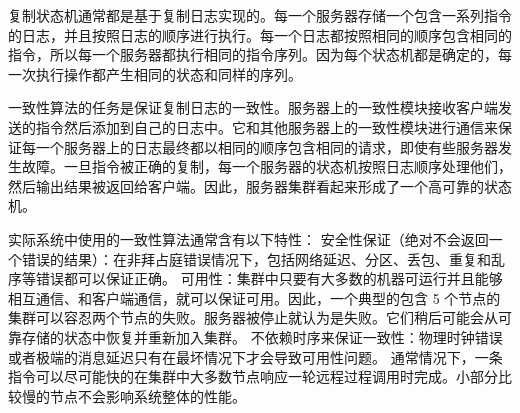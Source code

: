 复制状态机通常都是基于复制日志实现的。每一个服务器存储一个包含一系列指令的日志，并且按照日志的顺序进行执行。每一个日志都按照相同的顺序包含相同的指令，所以每一个服务器都执行相同的指令序列。因为每个状态机都是确定的，每一次执行操作都产生相同的状态和同样的序列。

一致性算法的任务是保证复制日志的一致性。服务器上的一致性模块接收客户端发送的指令然后添加到自己的日志中。它和其他服务器上的一致性模块进行通信来保证每一个服务器上的日志最终都以相同的顺序包含相同的请求，即使有些服务器发生故障。一旦指令被正确的复制，每一个服务器的状态机按照日志顺序处理他们，然后输出结果被返回给客户端。因此，服务器集群看起来形成了一个高可靠的状态机。

实际系统中使用的一致性算法通常含有以下特性：
安全性保证（绝对不会返回一个错误的结果）：在非拜占庭错误情况下，包括网络延迟、分区、丢包、重复和乱序等错误都可以保证正确。
可用性：集群中只要有大多数的机器可运行并且能够相互通信、和客户端通信，就可以保证可用。因此，一个典型的包含 5 个节点的集群可以容忍两个节点的失败。服务器被停止就认为是失败。它们稍后可能会从可靠存储的状态中恢复并重新加入集群。
不依赖时序来保证一致性：物理时钟错误或者极端的消息延迟只有在最坏情况下才会导致可用性问题。
通常情况下，一条指令可以尽可能快的在集群中大多数节点响应一轮远程过程调用时完成。小部分比较慢的节点不会影响系统整体的性能。







